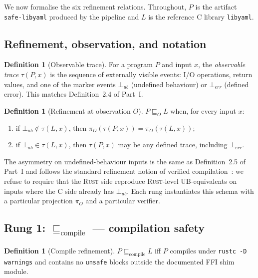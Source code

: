 \documentclass[12pt]{article}
\theoremstyle{definition}
\newtheorem{definition}[theorem]{Definition}
\theoremstyle{remark}
\newcommand{\rust}{\textnormal{\textsc{Rust}}}
\newcommand{\libyaml}{\texttt{libyaml}}
\newcommand{\safelibyaml}{\texttt{safe-libyaml}}
\newcommand{\refines}{\ensuremath{\sqsubseteq}}
\newcommand{\Compile}{\ensuremath{\sqsubseteq_{\!\mathrm{compile}}}}
\newcommand{\Trace}{\tau}
\begin{document}
We now formalise the six refinement relations. Throughout, \(P\) is the
artifact \safelibyaml{} produced by the pipeline and \(L\) is the
reference C library \libyaml{}.

\subsection{Refinement, observation, and notation}

\begin{definition}[Observable trace]
For a program \(P\) and input \(x\), the \emph{observable trace}
\(\Trace(P, x)\) is the sequence of externally visible events: I/O
operations, return values, and one of the marker events \(\bot_{\mathit{ub}}\)
(undefined behaviour) or \(\bot_{\mathit{err}}\) (defined error). This
matches Definition~2.4 of Part~I.
\end{definition}

\begin{definition}[Refinement at observation \(O\)]
\(P \refines_{\!O} L\) when, for every input \(x\):
\begin{enumerate}
\item if \(\bot_{\mathit{ub}} \notin \Trace(L, x)\), then
  \(\pi_O(\Trace(P, x)) = \pi_O(\Trace(L, x))\);
\item if \(\bot_{\mathit{ub}} \in \Trace(L, x)\), then \(\Trace(P, x)\)
  may be any defined trace, including \(\bot_{\mathit{err}}\).
\end{enumerate}
\end{definition}

The asymmetry on undefined-behaviour inputs is the same as
Definition~2.5 of Part~I and follows the standard refinement notion of
verified compilation~\cite{leroy2009}: we refuse to require that the
\rust{} side reproduce \rust-level UB-equivalents on inputs where the C
side already has \(\bot_{\mathit{ub}}\). Each rung instantiates this
schema with a particular projection \(\pi_O\) and a particular
verifier.

\subsection{Rung 1: $\Compile$ --- compilation safety}

\begin{definition}[Compile refinement]
\label{def:compile}
\(P \Compile L\) iff
\(P\) compiles under
\texttt{rustc -D warnings} and contains no \texttt{unsafe} blocks
outside the documented FFI shim module.
\end{definition}
\end{document}
